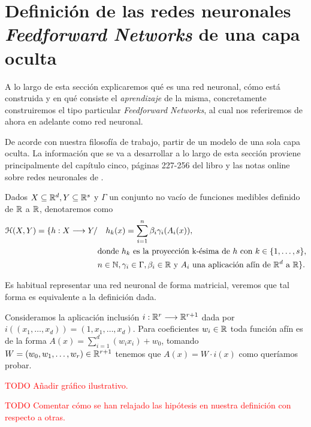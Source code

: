 %

\section{Definición de las redes neuronales \textit{Feedforward Networks} 
de una capa oculta} \label{sec:redes-neuronales-intro-una-capa}

A lo largo de esta sección  explicaremos qué es una red neuronal, cómo está construida y en qué consiste el \textit{aprendizaje} de la misma, concretamente
construiremos el tipo particular \textit{Feedforward Networks}, al cual nos referiremos de ahora
en adelante como red neuronal.

De acorde con nuestra filosofía de trabajo, partir de un modelo de una sola capa oculta. 
La información que se va a desarrollar a lo largo de esta 
sección proviene principalmente del capítulo cinco, páginas 227-256 del libro \cite{BishopPaterRecognition} y las notas online sobre redes neuronales de \cite{MostafaLearningFromData}.

\begin{definicion}
    Dados $X \subseteq \mathbb{R}^d, Y \subseteq \mathbb{R}^s$ y  $\Gamma$ un conjunto no vacío de funciones medibles definido de $\mathbb{R}$ a $\mathbb{R}$, denotaremos como 
    \begin{align}
        \mathcal{H}(X,Y) 
        =
        \{
            h : X \longrightarrow Y 
            /& \quad 
            h_k(x) = 
            \sum_{i=1}^n \beta_i \gamma_i( A_i(x)), \\
            & \text{donde  $h_k$  es la proyección k-ésima de $h$ con 
            $k \in \{1, \ldots, s\}$}, \\
            & n \in \mathbb{N},\gamma_i \in \Gamma , \beta_i \in \mathbb{R}
             \text{ y }A_i \text{ una aplicación afín de $\mathbb{R}^d$ a $\mathbb{R}$}           
        \}.
    \end{align}
\end{definicion}

Es habitual representar una red neuronal de forma matricial, veremos que tal forma es equivalente a la definición dada. 

Consideramos la aplicación inclusión 
$i: \mathbb{R}^r \longrightarrow \mathbb{R}^{r+1}$ dada por 
 $i((x_1, \ldots, x_d)) = (1,x_1, \ldots, x_d).$
Para coeficientes $w_i \in \mathbb{R}$ toda función afín es de la forma $A(x)= \sum_{i=1}^d( w_i x_i) + w_0$, 
tomando $W = (w_0, w_1, \ldots, w_r) \in \mathbb{R}^{r+1}$ tenemos que 
$A(x) = W \cdot i(x)$ como queríamos probar. 


\textcolor{red}{TODO Añadir gráfico ilustrativo.}


\textcolor{red}{TODO Comentar cómo se han relajado las hipótesis en nuestra definición con respecto a otras.}
